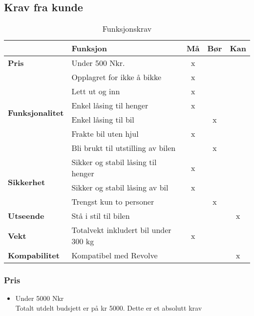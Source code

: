 \subsection{Krav fra kunde}
\begin{table}[h!]
\begin{tabular}{|l|l|c|c|c|}
\hline
 & \textbf{Funksjon} & \textbf{Må} & \textbf{Bør} & \textbf{Kan} \\ \hline
\textbf{Pris} & Under 500 Nkr. & x & & \\
\hline
\multirow{6}{*}{\textbf{Funksjonalitet}} 
 & Opplagret for ikke å bikke & x & & \\
 & Lett ut og inn & x & & \\
 & Enkel låsing til henger & x & & \\
 & Enkel låsing til bil & & x & \\
 & Frakte bil uten hjul & x & & \\
 & Bli brukt til utstilling av bilen & & x & \\
\hline
\multirow{3}{*}{\textbf{Sikkerhet}}
 & Sikker og stabil låsing til henger & x & & \\
 & Sikker og stabil låsing av bil & x & & \\
 & Trengst kun to personer & & x & \\
\hline
\textbf{Utseende} & Stå i stil til bilen & &  & x \\ \hline
\textbf{Vekt} & Totalvekt inkludert bil under 300 kg & x & & \\ \hline
\textbf{Kompabilitet} & Kompatibel med Revolve & & & x \\ \hline
\end{tabular}
\caption{Funksjonskrav}
\end{table}


\subsubsection{Pris}
\begin{itemize}
\item Under 5000 Nkr \\
Totalt utdelt budsjett er på kr 5000. Dette er et absolutt krav
\end{itemize}
